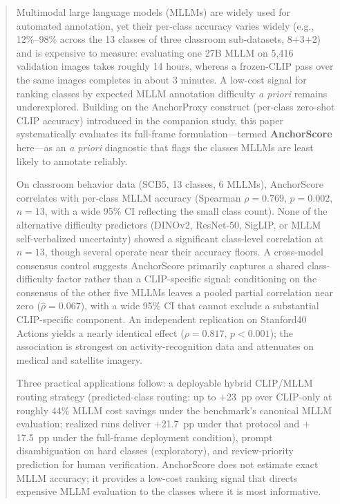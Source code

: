 \documentclass[a4paper,fleqn]{cas-sc}
\begin{document}
\let\WriteBookmarks\relax
\def\floatpagepagefraction{1}
\def\textpagefraction{.001}

\author[1]{Anonymous Author}
\author[2]{Anonymous Author}




\begin{abstract}
Multimodal large language models (MLLMs) are widely used for automated annotation, yet their per-class accuracy varies widely (e.g., 12\%--98\% across the 13 classes of three classroom sub-datasets, 8$+$3$+$2) and is expensive to measure: evaluating one 27B MLLM on 5{,}416 validation images takes roughly 14 hours, whereas a frozen-CLIP pass over the same images completes in about 3 minutes. A low-cost signal for ranking classes by expected MLLM annotation difficulty \emph{a priori} remains underexplored. Building on the AnchorProxy construct (per-class zero-shot CLIP accuracy) introduced in the companion study, this paper systematically evaluates its full-frame formulation---termed \textbf{AnchorScore} here---as an \emph{a priori} diagnostic that flags the classes MLLMs are least likely to annotate reliably.

On classroom behavior data (SCB5, 13 classes, 6 MLLMs), AnchorScore correlates with per-class MLLM accuracy (Spearman $\rho=0.769$, $p=0.002$, $n=13$, with a wide 95\% CI reflecting the small class count). None of the alternative difficulty predictors (DINOv2, ResNet-50, SigLIP, or MLLM self-verbalized uncertainty) showed a significant class-level correlation at $n=13$, though several operate near their accuracy floors. A cross-model consensus control suggests AnchorScore primarily captures a shared class-difficulty factor rather than a CLIP-specific signal: conditioning on the consensus of the other five MLLMs leaves a pooled partial correlation near zero ($\hat{\rho}=0.067$), with a wide 95\% CI that cannot exclude a substantial CLIP-specific component. An independent replication on Stanford40 Actions yields a nearly identical effect ($\rho=0.817$, $p<0.001$); the association is strongest on activity-recognition data and attenuates on medical and satellite imagery.

Three practical applications follow: a deployable hybrid CLIP/MLLM routing strategy (predicted-class routing: up to $+$23~pp over CLIP-only at roughly 44\% MLLM cost savings under the benchmark's canonical MLLM evaluation; realized runs deliver $+$21.7~pp under that protocol and $+$17.5~pp under the full-frame deployment condition), prompt disambiguation on hard classes (exploratory), and review-priority prediction for human verification. AnchorScore does not estimate exact MLLM accuracy; it provides a low-cost ranking signal that directs expensive MLLM evaluation to the classes where it is most informative.
\end{abstract}
\end{document}
